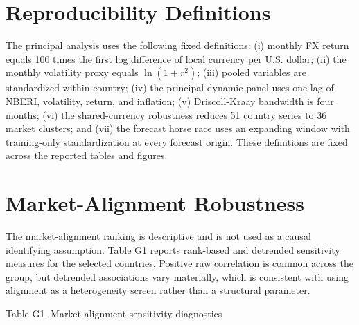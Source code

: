 \documentclass[11pt]{article}
\begin{document}
\section{Reproducibility Definitions}\label{appendix-f.-reproducibility-definitions}

The principal analysis uses the following fixed definitions: (i) monthly
FX return equals 100 times the first log difference of local currency
per U.S. dollar; (ii) the monthly volatility proxy equals \(\ln(1+r^2)\);
(iii) pooled variables are standardized within country; (iv) the
principal dynamic panel uses one lag of NBERI, volatility, return, and
inflation; (v) Driscoll-Kraay bandwidth is four months; (vi) the
shared-currency robustness reduces 51 country series to 36 market
clusters; and (vii) the forecast horse race uses an expanding window
with training-only standardization at every forecast origin. These
definitions are fixed across the reported tables and figures.

\section{Market-Alignment Robustness}\label{appendix-g.-market-alignment-robustness}

The market-alignment ranking is descriptive and is not used as a causal
identifying assumption. Table G1 reports rank-based and detrended
sensitivity measures for the selected countries. Positive raw
correlation is common across the group, but detrended associations vary
materially, which is consistent with using alignment as a heterogeneity
screen rather than a structural parameter.

Table G1. Market-alignment sensitivity diagnostics
\end{document}
